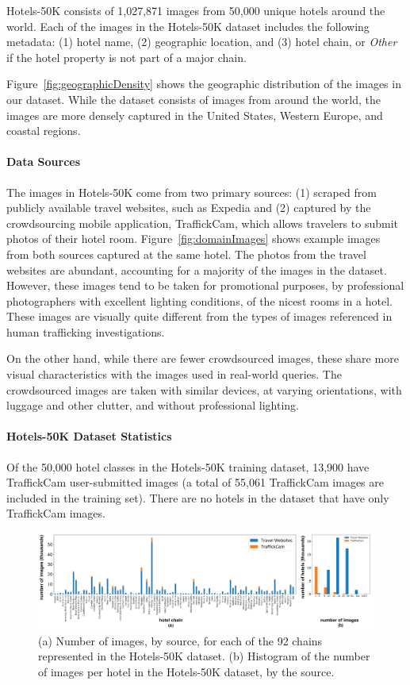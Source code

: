 Hotels-50K consists of 1,027,871 images from 50,000 unique hotels around the world. 
Each of the images in the Hotels-50K dataset includes the following metadata: (1) hotel name, (2) geographic location, and (3) hotel chain, or \emph{Other} if the hotel property is not part of a major chain.

Figure~\ref{fig:geographicDensity} shows the geographic distribution of the images in our dataset. While the dataset consists of images from around the world, the images are more densely captured in the United States, Western Europe, and coastal regions.

\paragraph{Data Sources} The images in Hotels-50K come from two primary sources: (1) scraped from publicly available travel websites, such as Expedia and (2) captured by the crowdsourcing mobile application, TraffickCam, which allows travelers to submit photos of their hotel room. Figure~\ref{fig:domainImages} shows example images from both sources captured at the same hotel. The photos from the travel websites are abundant, accounting for a majority of the images in the dataset. However, these images tend to be taken for 
promotional purposes, by professional photographers with excellent lighting 
conditions, of the nicest rooms in a hotel. These images are visually quite different from the types of images referenced in human trafficking investigations.

On the other hand, while there are fewer crowdsourced images, these share more visual characteristics with the images used in real-world queries. The crowdsourced images are taken with similar devices, at varying orientations, with luggage and other clutter, and without professional lighting.

\paragraph{Hotels-50K Dataset Statistics} Of the 50,000 hotel classes in the Hotels-50K training dataset, 13,900 have TraffickCam user-submitted images (a total of 55,061 TraffickCam images are included in the training set). There are no hotels in the dataset that have only TraffickCam images.

\begin{figure}
    \centering    \includegraphics[width=2\columnwidth]{figures/chapter4/imagesChainsAndHotels.jpg}
    \caption{(a) Number of images, by source, for each of the 92 chains represented in the Hotels-50K dataset. (b) Histogram of the number of images per hotel in the Hotels-50K dataset, by the source.}
    \label{fig:imsPerClass}
\end{figure}

